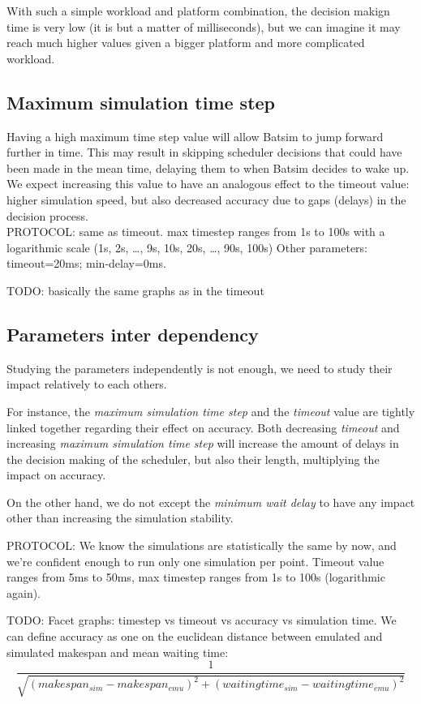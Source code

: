 \documentclass[12pt, a4paper]{memoir}
\begin{document}
With such a simple workload and platform combination, the decision makign time
is very low (it is but a matter of milliseconds), but we can imagine it may
reach much higher values given a bigger platform and more complicated workload.

\subsection{Maximum simulation time step}

Having a high maximum time step value will allow Batsim to jump forward further
in time. This may result in skipping scheduler decisions that could have been
made in the mean time, delaying them to when Batsim decides to wake up. We
expect increasing this value to have an analogous effect to the timeout value:
higher simulation speed, but also decreased accuracy due to gaps (delays) in
the decision process.\\

PROTOCOL: same as timeout. max timestep ranges from 1s to 100s with a
logarithmic scale (1s, 2s, \ldots, 9s, 10s, 20s, \ldots, 90s, 100s) Other
parameters: timeout=20ms; min-delay=0ms.

TODO: basically the same graphs as in the timeout

\subsection{Parameters inter dependency}

Studying the parameters independently is not enough, we need to study their
impact relatively to each others.

For instance, the \textit{maximum simulation time step} and the
\textit{timeout} value are tightly linked together regarding their effect on
accuracy. Both decreasing \textit{timeout} and increasing \textit{maximum
simulation time step} will increase the amount of delays in the decision making
of the scheduler, but also their length, multiplying the impact on accuracy.

On the other hand, we do not except the \textit{minimum wait delay} to have any
impact other than increasing the simulation stability.

PROTOCOL: We know the simulations are statistically the same by now, and we're
confident enough to run only one simulation per point. Timeout value ranges
from 5ms to 50ms, max timestep ranges from 1s to 100s (logarithmic again).

TODO: Facet graphs: timestep vs timeout vs accuracy vs simulation time. We can
define accuracy as one on the euclidean distance between emulated and simulated
makespan and mean waiting time: \[\frac{1}{\sqrt{(makespan_{sim} -
	makespan_{emu})^2 + (waitingtime_{sim} - waitingtime_{emu})^2}}\]
\end{document}
